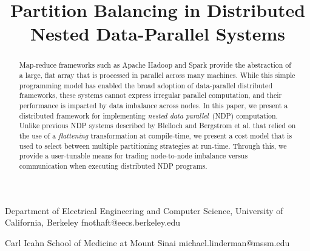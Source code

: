 \documentclass[preprint]{sigplanconf}
\theoremstyle{definition}
\begin{document}
\setlength{\pdfpageheight}{\paperheight}
\setlength{\pdfpagewidth}{\paperwidth}







\title{Partition Balancing in Distributed Nested Data-Parallel Systems}
{Department of Electrical Engineering and Computer Science, University of California, Berkeley}
{fnothaft@eecs.berkeley.edu}

{Carl Icahn School of Medicine at Mount Sinai}
{michael.linderman@mssm.edu}

\maketitle

\raggedbottom

\begin{abstract}

Map-reduce frameworks such as Apache Hadoop and Spark provide the abstraction of a large, flat
array that is processed in parallel across many machines. While this simple programming model has
enabled the broad adoption of data-parallel distributed frameworks, these systems cannot express
irregular parallel computation, and their performance is impacted by data imbalance across nodes.
In this paper, we present a distributed framework for implementing \emph{nested data parallel}~(NDP)
computation. Unlike previous NDP systems described by Blelloch and Bergstrom et al. that relied on
the use of a \emph{flattening} transformation at compile-time, we present a cost model that is used
to select between multiple partitioning strategies at run-time. Through this, we provide a user-tunable
means for trading node-to-node imbalance versus communication when executing distributed NDP
programs.

\end{abstract}
\end{document}
